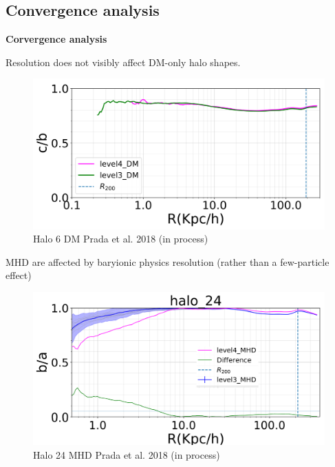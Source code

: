 \documentclass[xcolor=dvipsnames]{beamer}
\begin{document}
\subsection{Convergence analysis}
\begin{frame}
\centering
\LARGE
\textbf{Corvergence analysis}
\normalsize
\end{frame}


\begin{frame}
\centering
Resolution does not visibly affect DM-only halo shapes.
\begin{figure}[!ht]
  \centering
  \includegraphics[width=1\columnwidth]{./pics/halo6_DM_3Vs4_good.png}
  \caption{Halo 6 DM \tiny Prada et al. 2018 (in process)}
  
\end{figure}
\end{frame}


\begin{frame}
\centering
MHD are affected by baryionic physics resolution (rather than a few-particle effect)
\begin{figure}[!ht]
  \centering  
  \includegraphics[width=1\columnwidth]{./pics/rand_conv_halo24_MHD.png}
  \caption{Halo 24 MHD \tiny Prada et al. 2018 (in process)}
\end{figure}
\end{frame}
\end{document}
